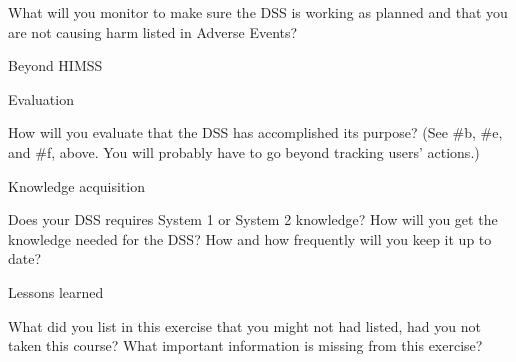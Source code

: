 \documentclass{article}
\begin{document}
What will you monitor to make sure the DSS is working as planned and that you are not causing harm listed in Adverse Events? 

Beyond HIMSS 

Evaluation 

How will you evaluate that the DSS has accomplished its purpose? (See #b, #e, and #f, above. You will probably have to go beyond tracking users’ actions.) 

Knowledge acquisition 

Does your DSS requires System 1 or System 2 knowledge? How will you get the knowledge needed for the DSS? How and how frequently will you keep it up to date? 

Lessons learned 

What did you list in this exercise that you might not had listed, had you not taken this course? What important information is missing from this exercise?
\end{document}
